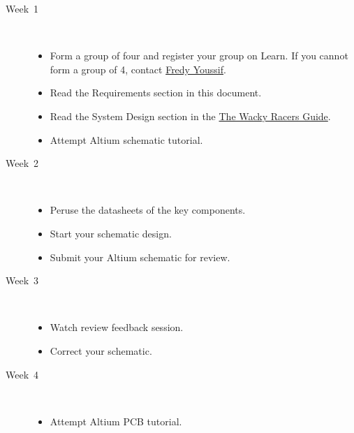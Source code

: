 \documentclass[11pt, a4paper]{article}
\makeatletter
\newcommand{\fredy}{\href{mailto:fredy.youssif@pg.canterbury.ac.nz}{Fredy Youssif}}
\newcommand{\theguide}{\href{https://eng-git.canterbury.ac.nz/wacky-racers/wacky-racers/-/blob/master/doc/guide/guide.pdf}{The Wacky Racers Guide}}
\makeatother
\begin{document}
\begin{description}
\item [Week~1]\mbox{}\\[-0.4cm]

  \begin{itemize}
  \item Form a group of four and register your group on Learn.  If you
    cannot form a group of 4, contact \fredy.

  \item Read the Requirements section in this document.

  \item Read the System Design section in the \theguide.

  \item Attempt Altium schematic tutorial.

  \end{itemize}

\item [Week~2]\mbox{}\\[-0.4cm]

  \begin{itemize}
  \item Peruse the datasheets of the key components.

  \item Start your schematic design.

  \item Submit your Altium schematic for review.

  \end{itemize}

\item [Week~3]\mbox{}\\[-0.4cm]

  \begin{itemize}
  \item Watch review feedback session.

  \item Correct your schematic.

  \end{itemize}

\item [Week~4]\mbox{}\\[-0.4cm]

  \begin{itemize}
  \item Attempt Altium PCB tutorial.


\end{itemize}
\end{description}
\end{document}
